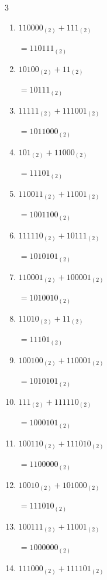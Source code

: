 \begin{multicols}{3}
\begin{enumerate}
        $=1010111_{(2)}$

  \item $110000_{(2)} + 111_{(2)}$

        $=110111_{(2)}$

  \item $10100_{(2)} + 11_{(2)}$

        $=10111_{(2)}$

  \item $11111_{(2)} + 111001_{(2)}$

        $=1011000_{(2)}$

  \item $101_{(2)} + 11000_{(2)}$

        $=11101_{(2)}$

  \item $110011_{(2)} + 11001_{(2)}$

        $=1001100_{(2)}$

  \item $111110_{(2)} + 10111_{(2)}$

        $=1010101_{(2)}$

  \item $110001_{(2)} + 100001_{(2)}$

        $=1010010_{(2)}$

  \item $11010_{(2)} + 11_{(2)}$

        $=11101_{(2)}$

\columnbreak %

\resetques

  \item $100100_{(2)} + 110001_{(2)}$

        $=1010101_{(2)}$

  \item $111_{(2)} + 111110_{(2)}$

        $=1000101_{(2)}$

  \item $100110_{(2)} + 111010_{(2)}$

        $=1100000_{(2)}$

  \item $10010_{(2)} + 101000_{(2)}$

        $=111010_{(2)}$

  \item $100111_{(2)} + 11001_{(2)}$

        $=1000000_{(2)}$

  \item $111000_{(2)} + 111101_{(2)}$


\end{enumerate}
\end{multicols}
